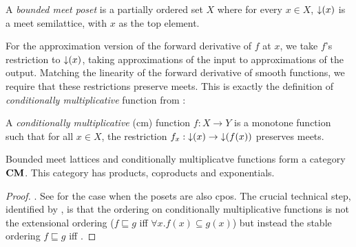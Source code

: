 \begin{definition}
  A \emph{bounded meet poset} is a partially ordered set $X$ where for every $x \in X$, $\mathop{\downarrow}(x)$ is a meet semilattice, with $x$ as the top element.
\end{definition}

For the approximation version of the forward derivative of $f$ at $x$, we take $f$'s restriction to $\mathop{\downarrow}(x)$, taking approximations of the input to approximations of the output. Matching the linearity of the forward derivative of smooth functions, we require that these restrictions preserve meets. This is exactly the definition of \emph{conditionally multiplicative} function from \citet{berry79}:

\begin{definition}
  A \emph{conditionally multiplicative} (cm) function $f : X \to Y$ is
  a monotone function such that for all $x \in X$, the restriction
  $f_x : \mathop{\downarrow}(x) \to \mathop{\downarrow}(f(x))$ preserves meets.
\end{definition}

\begin{theorem}
  Bounded meet lattices and conditionally multiplicatve functions form
  a category $\mathbf{CM}$. This category has products, coproducts and
  exponentials.
\end{theorem}

\begin{proof}
  \AGDA. See \citet{amadio-curien} for the case when the posets are
  also cpos. The crucial technical step, identified by
  \citet{berry79}, is that the ordering on conditionally
  multiplicative functions is not the extensional ordering
  ($f \sqsubseteq g$ iff $\forall x. f(x) \subseteq g(x)$) but instead
  the stable ordering $f \sqsubseteq g$ iff .
\end{proof}

